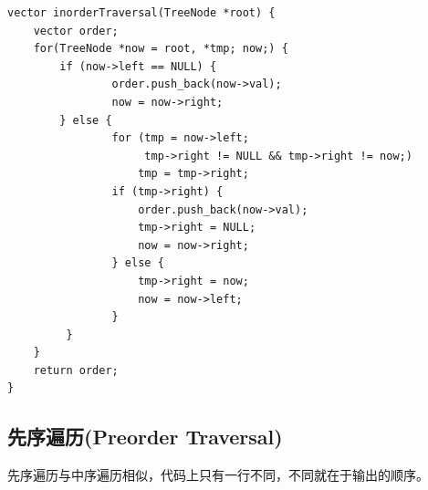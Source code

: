 \documentclass[12pt]{book}
\begin{document}
\begin{enumerate}
\lstset{language=java,label= ,caption= ,numbers=none}
\begin{lstlisting}
vector inorderTraversal(TreeNode *root) {
    vector order;
    for(TreeNode *now = root, *tmp; now;) {
        if (now->left == NULL) {
                order.push_back(now->val);
                now = now->right;   
        } else {                
                for (tmp = now->left;
                     tmp->right != NULL && tmp->right != now;) 
                    tmp = tmp->right;
                if (tmp->right) {
                    order.push_back(now->val);
                    tmp->right = NULL;
                    now = now->right;
                } else {
                    tmp->right = now;
                    now = now->left;
                }
         }
    }
    return order;
}
\end{lstlisting}
\end{enumerate}

\subsection{先序遍历(Preorder Traversal)}
\label{sec-4-1-2}
先序遍历与中序遍历相似，代码上只有一行不同，不同就在于输出的顺序。
\end{document}
